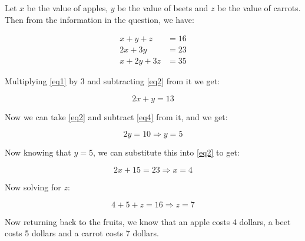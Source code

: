 \documentclass[11pt]{article}
\begin{document}
\begin{solution}
    Let $x$ be the value of apples, $y$ be the value of beets and $z$ be the value of carrots. Then from the information in the question, we have: 

    \begin{align}
        \label{eq1} x + y + z &= 16\\
        \label{eq2} 2x + 3y &= 23\\
        \label{eq3} x + 2y + 3z &= 35
    \end{align}

    Multiplying \cref{eq1} by 3 and subtracting \cref{eq2} from it we get:

    \begin{equation}\label{eq4}
        2x + y = 13
    \end{equation}

    Now we can take \cref{eq2} and subtract \cref{eq4} from it, and we get:

    \[ 2y = 10 \Longrightarrow \boxed{y = 5}\]

    Now knowing that $y = 5$, we can substitute this into \cref{eq2} to get:

    \[ 2x + 15 = 23 \Longrightarrow \boxed{x = 4}\]

    Now solving for $z$:
    
    \[ 4 + 5 + z = 16 \Longrightarrow \boxed{z = 7}\]

    Now returning back to the fruits, we know that an apple costs 4 dollars, a beet costs 5 dollars and a carrot costs 7 dollars.
\end{solution}

\end{document}
